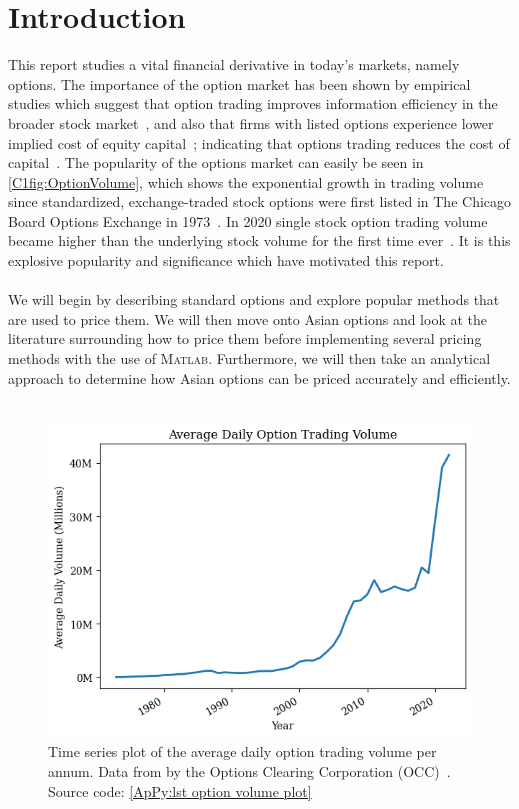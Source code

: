 \chapter{Introduction}
This report studies a vital financial derivative in today's markets, namely options. The importance of the option market has been shown by empirical studies which suggest that option trading improves information efficiency in the broader stock market~\cite{PanInfoEffic,li2021effect}, and also that firms with listed options experience lower implied cost of equity capital~\cite{naikerLowEquity}; indicating that options trading reduces the cost of capital~\cite{li2021effect}. The popularity of the options market can easily be seen in \autoref{C1fig:OptionVolume}, which shows the exponential growth in trading volume since standardized, exchange-traded stock options were first listed in The Chicago Board Options Exchange in 1973~\cite{markham2002financial}. In 2020 single stock option trading volume became higher than the underlying stock volume for the first time ever~\cite{yahooOptions}. 
\nline{}
It is this explosive popularity and significance which have motivated this report. 
\\\\
We will begin by describing standard options and explore popular methods that are used to price them. We will then move onto Asian options and look at the literature surrounding how to price them before implementing several pricing methods with the use of \textsc{Matlab}. Furthermore, we will then take an analytical approach to determine how Asian options can be priced accurately and efficiently.
\\\\

\begin{figure}[H]
    \centering
    \includegraphics[width=\sOneSize\textwidth]{Chapters/C1/plots/OptionVolume.png}
    \caption{Time series plot of the average daily option trading volume per annum. Data from by the Options Clearing Corporation (OCC)~\cite{THEOCC}. Source code: \autoref{ApPy:lst option volume plot}}\label{C1fig:SymRw}
\end{figure}

